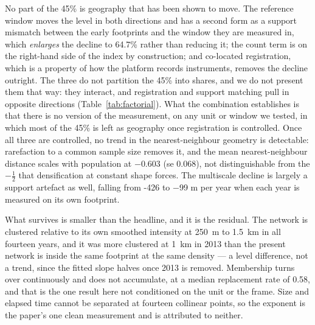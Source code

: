 \documentclass[fleqn,10pt,lineno]{wlpeerj}
\newcommand{\rOwnHull}{64.7}
\newcommand{\replMedian}{0.58}
\newcommand{\cleanSlopeLoc}{-0.603}
\newcommand{\cleanSELoc}{0.068}
\newcommand{\locHullDrop}{45}
\newcommand{\lKmExact}{-426}
\begin{document}
No part of the \locHullDrop\% is geography that has been shown to move. The
reference window moves the level in both directions and has a second form as a support mismatch
between the early footprints and the window they are measured in, which \emph{enlarges} the
decline to \rOwnHull\% rather than reducing it; the count term is on the
right-hand side of the index by construction; and co-located registration, which is a property of
how the platform records instruments, removes the decline outright. The three do not partition
the \locHullDrop\% into shares, and we do not present them that way: they interact, and
registration and support matching pull in opposite directions
(Table~\ref{tab:factorial}). What the combination establishes is that there is no version of the
measurement, on any unit or window we tested, in which most of the \locHullDrop\% is left as
geography once registration is controlled. Once all three are
controlled, no trend in the nearest-neighbour geometry is detectable: rarefaction to a common
sample size removes it, and the mean nearest-neighbour distance scales with population at
$\cleanSlopeLoc$ (se \cleanSELoc), not distinguishable from the $-\tfrac12$ that densification
at constant shape forces. The multiscale decline is largely a support artefact as well,
falling from \lKmExact{} to \num{-99} m per year when each year is measured on its own
footprint.

What survives is smaller than the headline, and it is the residual. The network is
clustered relative to its own smoothed intensity at \SI{250}{\meter} to \SI{1.5}{\kilo\meter} in
all fourteen years, and it was more clustered at \SI{1}{\kilo\meter} in 2013 than the present
network is inside the same footprint at the same density --- a level difference, not a
trend, since the fitted slope halves once 2013 is removed. Membership turns over continuously
and does not accumulate, at a median replacement rate of \replMedian{}, and that is the one
result here not conditioned on the unit or the frame. Size and elapsed time cannot be separated
at fourteen collinear points, so the exponent is the paper's one clean measurement and is
attributed to neither.
\end{document}
